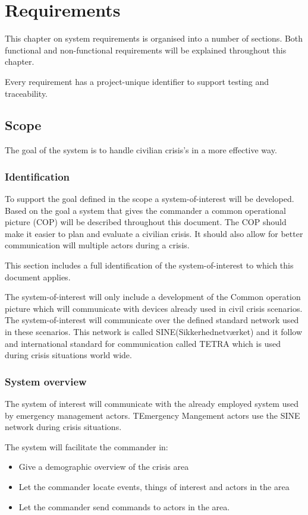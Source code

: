 \label{chp_requirements}
\chapter{Requirements}
This chapter on system requirements is organised into a number of sections. Both functional and non-functional requirements will be explained throughout this chapter.

Every requirement has a project-unique identifier to support testing and traceability.

\section{Scope}
The goal of the system is to handle civilian crisis's in a more effective way. 

\subsection{Identification}
To support the goal defined in the scope a system-of-interest will be developed. Based on the goal a system that gives the commander a common operational picture (COP) will be described throughout this document. The COP should make it easier to plan and evaluate a civilian crisis. It should also allow for better communication will multiple actors during a crisis.

This section includes a full identification of the system-of-interest to which this document applies.

The system-of-interest will only include a development of the Common operation picture which will communicate with devices already used in civil crisis scenarios. The system-of-interest will communicate over the defined standard network used in these scenarios. This network is called SINE(Sikkerhednetværket) and it follow and international standard for communication called TETRA which is used during crisis situations world wide. 

\subsection{System overview}
The system of interest will communicate with the already employed system used by emergency management actors. TEmergency Mangement actors use the SINE network during crisis situations.

The system will facilitate the commander in:
\begin{itemize}
	\item Give a demographic overview of the crisis area
	\item Let the commander locate events, things of interest and actors in the area
	\item Let the commander send commands to actors in the area.
\end{itemize}

